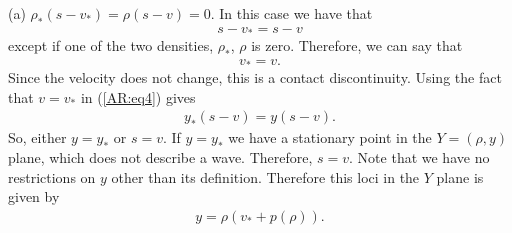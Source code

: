 \documentclass{article}
\begin{document}
(a) $\rho_*(s - v_*) = \rho (s - v) = 0$. In this case we have that
\begin{align*}
s - v_* = s - v 
\end{align*}
except if one of the two densities, $\rho_*$, $\rho$ is zero. Therefore, we can say that
\begin{align*}
v_* = v.
\end{align*}
Since the velocity does not change, this is a contact discontinuity. Using the fact that $v = v_*$ in (\ref{AR:eq4}) gives
\begin{align*}
y_*(s - v) = y(s - v).
\end{align*}
So, either $y = y_*$ or $s = v$. If $y = y_*$ we have a stationary point in the $Y = (\rho, y)$ plane, which does not 
describe a wave. Therefore, $s = v$. Note that we have no restrictions on $y$ other than its definition. 
Therefore this loci in the $Y$ plane is given by 
\begin{align*}
y = \rho ( v_* + p(\rho )).
\end{align*}
\end{document}
